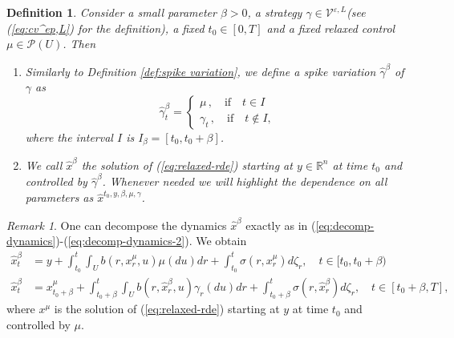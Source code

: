 \documentclass[12pt,reqno]{amsart}
\numberwithin{equation}{section}  %
\newcommand{\1}{{\bf 1}}
\newcommand{\2}{{\bf 2}}
\newcommand{\R}{\mathbb R}
\newcommand{\ga}{\gamma}
\newtheorem{definition}[theorem]{Definition}
\theoremstyle{remark}
\newtheorem{remark}[theorem]{Remark}
\theoremstyle{remark}
\begin{document}
\begin{definition}\label{def:f1}
Consider a small parameter $\beta>0$, a strategy $\ga \in \mathcal{V}^{\varepsilon,L}$(see (\ref{eq:cv^ep,L}) for the definition), a fixed $t_0\in[0,T]$ and a fixed relaxed control $\mu\in \mathcal{P}(U)$. Then
\begin{enumerate}[wide, labelwidth=!, labelindent=0pt, label=\emph{(\arabic*)}]
\setlength\itemsep{.1in}         
\item Similarly to Definition \ref{def:spike variation}, we define a spike variation $\hat{\ga}^{\beta}$ of $\ga$ as 
    \begin{equation}\label{eq: Qspike} \hat{\ga}^{\beta}_{t}=
        \begin{cases}
            \mu\, , \quad \text{if} \quad t\in I\\
            \ga_{t}\, , \quad \text{if} \quad t\notin I,
        \end{cases}
    \end{equation}
    where the interval $I$ is $I_{\beta}=[t_0,t_0+\beta]$.
    \item We call $\hat{x}^{\beta}$ the solution of (\ref{eq:relaxed-rde}) starting at $y\in \R^{n}$ at time $t_0$ and controlled by $\hat{\ga}^{\beta}$. Whenever needed we will highlight the dependence on all parameters as $\hat{x}^{t_0,y,\beta,\mu,\ga}$.
\end{enumerate}
\end{definition}
\begin{remark}
    One can decompose the dynamics $\hat{x}^{\beta}$ exactly as in (\ref{eq:decomp-dynamics})-(\ref{eq:decomp-dynamics-2}). We obtain
    \begin{equation}\label{eq:rde-a-ga}
        \begin{aligned}
            \hat{x}_{t}^{\beta}&=y+\int_{t_0}^{t}\int_U b(r,x_{r}^{{\mu}},u)\mu(du)dr+\int_{t_0}^{t}\sigma(r,x_{r}^{{\mu}})d\zeta_{r}, \quad t\in[t_0,t_0+\beta)\\
            \hat{x}_{t}^{\beta}&=x_{t_0+\beta}^{\mu}+\int_{t_0+\beta}^{t}\int_{U}b(r,{\hat{x}_{r}^{\beta}},u)\ga_{r}(du)dr+\int_{t_0+\beta}^{t}\sigma(r,{\hat{x}_{r}^{\beta}})d\zeta_{r},\quad t\in[t_0+\beta,T],
        \end{aligned}
    \end{equation}
where $x^{\mu}$ is the solution of (\ref{eq:relaxed-rde}) starting at $y$ at time $t_{0}$ and controlled by $\mu$.
\end{remark}
\end{document}
